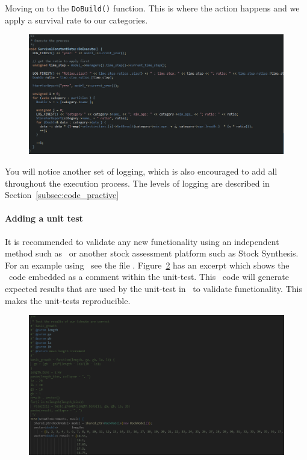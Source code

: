 Moving on to the \texttt{DoBuild()} function. This is where the action happens and we apply a survival rate to our categories.
\clearpage
\begin{figure}[!ht]
	\centering
	\includegraphics[scale=0.5]{Figures/execute.png}
	\caption{}\label{fig:execute}
\end{figure}

You will notice another set of logging, which is also encouraged to add all throughout the execution process. The levels of logging are described in Section~\ref{subsec:code_practive}


\paragraph*{Adding a unit test}

It is recommended to validate any new functionality using an independent method such as \R\ or another stock assessment platform such as Stock Synthesis. For an example using \R\ see the file . Figure~\ref{fig:unittest1} has an excerpt which shows the \R\ code embedded as a comment within the unit-test. This \R\ code will generate expected results that are used by the unit-test in \CNAME\ to validate functionality. This makes the unit-tests reproducible.

\begin{figure}[!ht]
	\centering
	\includegraphics[scale=0.65]{Figures/unittestWithR.png}
	\caption{}\label{fig:unittest1}
\end{figure}

